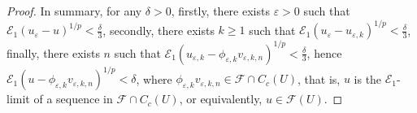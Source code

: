 \documentclass[11pt,a4paper]{article}
\numberwithin{equation}{section}
\theoremstyle{plain}
\theoremstyle{definition}
\begin{document}
\begin{proof}
In summary, for any $\delta>0$, firstly, there exists $\varepsilon>0$ such that $\mathcal{E}_1(u_\varepsilon-u)^{1/p}<\frac{\delta}{3}$, secondly, there exists $k\ge1$ such that $\mathcal{E}_1(u_\varepsilon-u_{\varepsilon,k})^{1/p}<\frac{\delta}{3}$, finally, there exists $n$ such that $\mathcal{E}_1(u_{\varepsilon,k}-\phi_{\varepsilon,k} v_{\varepsilon,k,n})^{1/p}<\frac{\delta}{3}$, hence $\mathcal{E}_1(u-\phi_{\varepsilon,k} v_{\varepsilon,k,n})^{1/p}<\delta$, where $\phi_{\varepsilon,k} v_{\varepsilon,k,n}\in\mathcal{F}\cap C_c(U)$, that is, $u$ is the $\mathcal{E}_1$-limit of a sequence in $\mathcal{F}\cap C_c(U)$, or equivalently, $u\in\mathcal{F}(U)$.
\end{proof}



%
\end{document}
